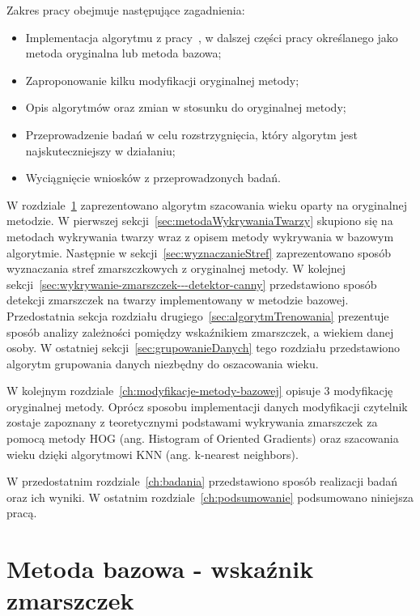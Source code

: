 \documentclass[a4paper,twoside,12pt]{book}
\begin{document}
    Zakres pracy obejmuje następujące zagadnienia:
    \begin{itemize}
        \item Implementacja algorytmu z pracy~\cite{wrinkleFeatures}, w dalszej części pracy określanego jako metoda
        oryginalna lub metoda bazowa;
        \item Zaproponowanie kilku modyfikacji oryginalnej metody;
        \item Opis algorytmów oraz zmian w stosunku do oryginalnej metody;
        \item Przeprowadzenie badań w celu rozstrzygnięcia, który algorytm jest najskuteczniejszy w działaniu;
        \item Wyciągnięcie wniosków z przeprowadzonych badań.
    \end{itemize}
    W rozdziale~\ref{ch:metoda-bazowa---wrinkle-feature} zaprezentowano algorytm szacowania wieku oparty na oryginalnej metodzie.
    W pierwszej sekcji~\ref{sec:metodaWykrywaniaTwarzy} skupiono się na metodach wykrywania twarzy wraz z opisem
    metody wykrywania w bazowym algorytmie.
    Następnie w sekcji~\ref{sec:wyznaczanieStref} zaprezentowano sposób wyznaczania stref zmarszczkowych z oryginalnej metody.
    W kolejnej sekcji~\ref{sec:wykrywanie-zmarszczek---detektor-canny} przedstawiono sposób detekcji zmarszczek na twarzy implementowany
    w metodzie bazowej.
    Przedostatnia sekcja rozdziału drugiego~\ref{sec:algorytmTrenowania}  prezentuje sposób analizy %
    zależności pomiędzy wskaźnikiem zmarszczek, a wiekiem
    danej osoby.
    W ostatniej sekcji~\ref{sec:grupowanieDanych} tego rozdziału przedstawiono algorytm grupowania danych niezbędny do oszacowania wieku.

    W kolejnym rozdziale~\ref{ch:modyfikacje-metody-bazowej} opisuje 3 modyfikację oryginalnej metody.
    Oprócz sposobu implementacji danych modyfikacji czytelnik zostaje zapoznany z teoretycznymi podstawami wykrywania zmarszczek za
    pomocą metody HOG (ang. Histogram of Oriented Gradients) oraz szacowania wieku dzięki algorytmowi KNN (ang.  k-nearest neighbors).

    W przedostatnim rozdziale~\ref{ch:badania} przedstawiono sposób realizacji badań oraz ich wyniki.
    W ostatnim rozdziale~\ref{ch:podsumowanie} podsumowano niniejsza pracą.

    \chapter{Metoda bazowa - wskaźnik zmarszczek}\label{ch:metoda-bazowa---wrinkle-feature}
\end{document}

